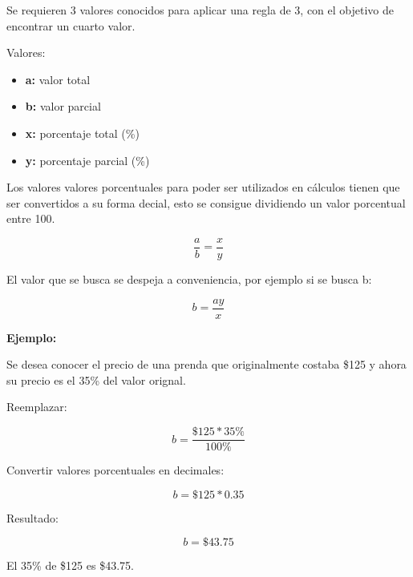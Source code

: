 Se requieren 3 valores conocidos para aplicar una regla de 3, con el objetivo de encontrar un cuarto valor.

Valores:

\begin{itemize}
  \item \textbf{a:} valor total
  \item \textbf{b:} valor parcial
  \item \textbf{x:} porcentaje total (\%)
  \item \textbf{y:} porcentaje parcial (\%)
\end{itemize}

Los valores valores porcentuales para poder ser utilizados en cálculos tienen que ser convertidos a su forma decial, esto se consigue dividiendo un valor porcentual entre 100.

\[\boxed{
  \dfrac{a}{b}=\dfrac{x}{y}
}\]

El valor que se busca se despeja a conveniencia, por ejemplo si se busca b:

\[
  b=\dfrac{ay}{x}
\]

\textbf{Ejemplo:}

Se desea conocer el precio de una prenda que originalmente costaba \$125 y ahora su precio es el 35\% del valor orignal.

Reemplazar:

\[
  b=\dfrac{\$125*35\%}{100\%}
\]

Convertir valores porcentuales en decimales:

\[
  b=\$125*0.35
\]

Resultado:

\[
  b=\$43.75
\]

El 35\% de \$125 es \$43.75.

